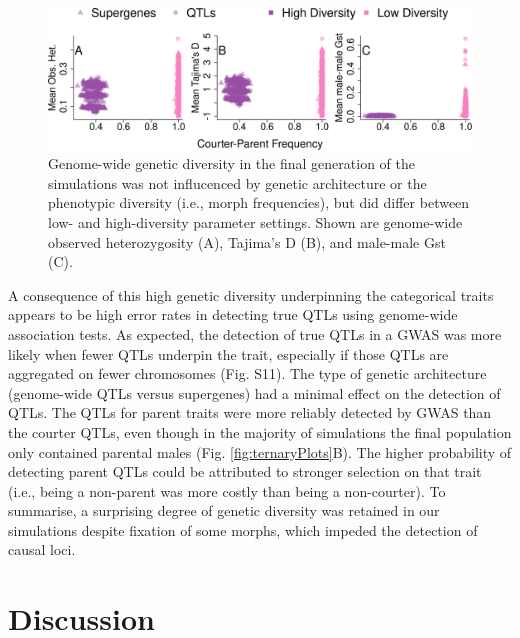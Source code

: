 \documentclass[
  11pt,
  a4paper,
]{article}
\begin{document}
\begin{figure}[H]
\includegraphics[width=9.71in,]{../figs/genomewideDiv-1} \caption{Genome-wide genetic diversity in the final generation of the simulations was not influcenced by genetic architecture or the phenotypic diversity (i.e., morph frequencies), but did differ between low- and high-diversity parameter settings. Shown are genome-wide observed heterozygosity (A), Tajima’s D (B), and male-male Gst (C).}\label{fig:genomewideDiv}
\end{figure}

A consequence of this high genetic diversity underpinning the
categorical traits appears to be high error rates in detecting true QTLs
using genome-wide association tests. As expected, the detection of true
QTLs in a GWAS was more likely when fewer QTLs underpin the trait,
especially if those QTLs are aggregated on fewer chromosomes (Fig. S11).
The type of genetic architecture (genome-wide QTLs versus supergenes)
had a minimal effect on the detection of QTLs. The QTLs for parent
traits were more reliably detected by GWAS than the courter QTLs, even
though in the majority of simulations the final population only
contained parental males (Fig. \ref{fig:ternaryPlots}B). The higher
probability of detecting parent QTLs could be attributed to stronger
selection on that trait (i.e., being a non-parent was more costly than
being a non-courter). To summarise, a surprising degree of genetic
diversity was retained in our simulations despite fixation of some
morphs, which impeded the detection of causal loci.

\hypertarget{discussion}{%
\section{Discussion}\label{discussion}}
\end{document}

